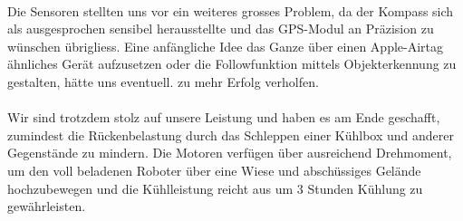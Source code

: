 \\
Die Sensoren stellten uns vor ein weiteres grosses Problem, da der Kompass sich als ausgesprochen sensibel herausstellte und das GPS-Modul an Präzision zu wünschen übrigliess. Eine anfängliche Idee das Ganze über einen Apple-Airtag ähnliches Gerät aufzusetzen oder die Followfunktion mittels Objekterkennung zu gestalten, hätte uns eventuell. zu mehr Erfolg verholfen.\\
\\
Wir sind trotzdem stolz auf unsere Leistung und haben es am Ende geschafft, zumindest die Rückenbelastung durch das Schleppen einer Kühlbox und anderer Gegenstände zu mindern. Die Motoren verfügen über ausreichend Drehmoment, um den voll beladenen Roboter über eine Wiese und abschüssiges Gelände hochzubewegen und die Kühlleistung reicht aus um 3 Stunden Kühlung zu gewährleisten. 

